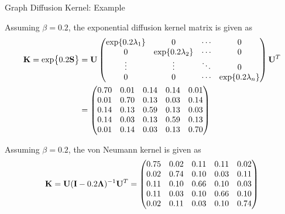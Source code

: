\begin{frame}{Graph Diffusion Kernel: Example}

  Assuming $\beta = 0.2$, the exponential diffusion kernel
  matrix is given as
  \begin{align*}
    \bK = \exp\bigl\{ 0.2 \bS \bigr\} & =
  \bU \matr{
  \exp\{0.2\lambda_1\} & 0 & \cdots & 0\\
  0 & \exp\{0.2\lambda_2\} & \cdots & 0\\
  \vdots & \vdots & \ddots & 0\\
  0 & 0 & \cdots & \exp\{0.2\lambda_n\}
  } \bU^T\\
  & =
    \matr{
0.70& 0.01& 0.14& 0.14& 0.01\\
0.01& 0.70& 0.13& 0.03& 0.14\\
0.14& 0.13& 0.59& 0.13& 0.03\\
0.14& 0.03& 0.13& 0.59& 0.13\\
0.01& 0.14& 0.03& 0.13& 0.70\\
    }
  \end{align*}

Assuming $\beta = 0.2$, the von Neumann kernel is given as
  \begin{align*}
    \mathbf{K} = \mathbf{U}(\mathbf{I} - 0.2{\bm \Lambda})^{-1} \mathbf{U}^T =
    \begin{pmatrix} 
0.75& 0.02& 0.11& 0.11& 0.02\\
0.02& 0.74& 0.10& 0.03& 0.11\\
0.11& 0.10& 0.66& 0.10& 0.03\\
0.11& 0.03& 0.10& 0.66& 0.10\\
0.02& 0.11& 0.03& 0.10& 0.74\\
 \end{pmatrix}
  \end{align*}
\end{frame}

